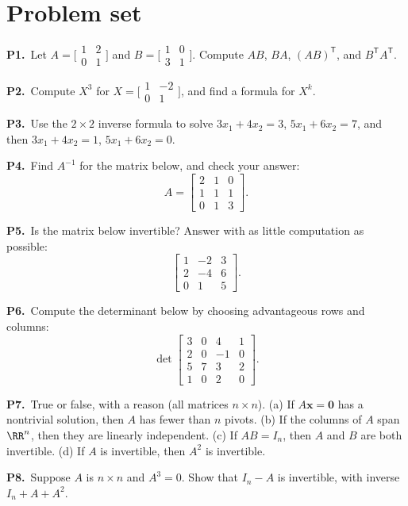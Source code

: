 \documentclass[10pt]{scrartcl}
\newcommand{\vv}[1]{\mathbf{#1}}
\begin{document}
\section{Problem set}
\begin{prob}\textbf{P1.}\ Let $A=\bigl[\begin{smallmatrix}1&2\\0&1\end{smallmatrix}\bigr]$ and $B=\bigl[\begin{smallmatrix}1&0\\3&1\end{smallmatrix}\bigr]$. Compute $AB$, $BA$, $(AB)^{\mathsf T}$, and $B^{\mathsf T}A^{\mathsf T}$.
\end{prob}
\begin{prob}\textbf{P2.}\ Compute $X^3$ for $X=\bigl[\begin{smallmatrix}1&-2\\0&1\end{smallmatrix}\bigr]$, and find a formula for $X^k$.
\end{prob}
\begin{prob}\textbf{P3.}\ Use the $2\times2$ inverse formula to solve $3x_1+4x_2=3$, $5x_1+6x_2=7$, and then $3x_1+4x_2=1$, $5x_1+6x_2=0$.
\end{prob}
\begin{prob}\textbf{P4.}\ Find $A^{-1}$ for the matrix below, and check your answer:
\[
  A = \begin{bmatrix} 2 & 1 & 0 \\ 1 & 1 & 1 \\ 0 & 1 & 3 \end{bmatrix}.
\]
\end{prob}
\begin{prob}\textbf{P5.}\ Is the matrix below invertible? Answer with as little computation as possible:
\[
  \begin{bmatrix} 1 & -2 & 3 \\ 2 & -4 & 6 \\ 0 & 1 & 5 \end{bmatrix}.
\]
\end{prob}
\begin{prob}\textbf{P6.}\ Compute the determinant below by choosing advantageous rows and columns:
\[
  \det\begin{bmatrix} 3 & 0 & 4 & 1 \\ 2 & 0 & -1 & 0 \\ 5 & 7 & 3 & 2 \\ 1 & 0 & 2 & 0 \end{bmatrix}.
\]
\end{prob}
\begin{prob}\textbf{P7.}\ True or false, with a reason (all matrices $n\times n$). (a) If $A\vv x=\vv0$ has a nontrivial solution, then $A$ has fewer than $n$ pivots. (b) If the columns of $A$ span $\RR^n$, then they are linearly independent. (c) If $AB=I_n$, then $A$ and $B$ are both invertible. (d) If $A$ is invertible, then $A^2$ is invertible.
\end{prob}
\begin{prob}\textbf{P8.}\ Suppose $A$ is $n\times n$ and $A^3=0$. Show that $I_n-A$ is invertible, with inverse $I_n+A+A^2$.
\end{prob}
\end{document}
